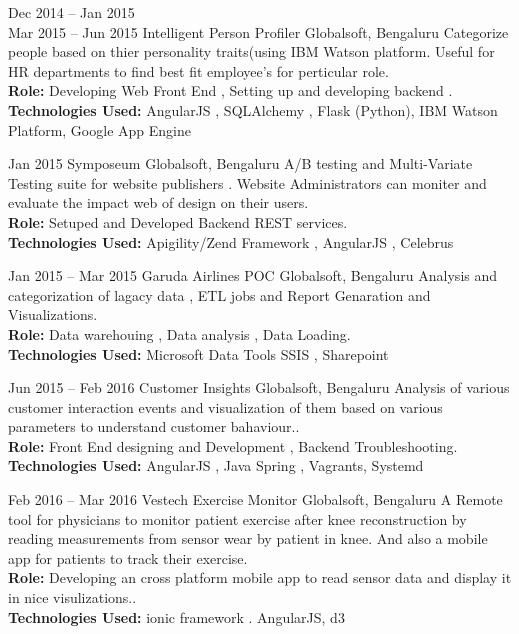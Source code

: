 \documentclass[]{friggeri-cv} %
\begin{document}
\begin{entrylist}
\entry
{ Dec 2014 -- Jan 2015\\
Mar 2015 -- Jun 2015}
{Intelligent Person Profiler}
{Globalsoft, Bengaluru}
{Categorize people based on thier personality traits(using IBM Watson platform. Useful for HR departments to find best fit employee's for perticular role.\\
\textbf{Role:} Developing Web Front End  , Setting up and developing backend .\\
\textbf{Technologies Used:} AngularJS , SQLAlchemy , Flask (Python), IBM Watson Platform, Google App Engine}
\end{entrylist}

\begin{entrylist}
\entry
{Jan 2015}
{Symposeum}
{Globalsoft, Bengaluru}
{A/B testing and Multi-Variate Testing suite for website publishers . Website Administrators can moniter and evaluate the impact web of design on their users.\\
\textbf{Role:} Setuped and Developed Backend REST services.\\
\textbf{Technologies Used:} Apigility/Zend Framework , AngularJS , Celebrus}
\end{entrylist}

\begin{entrylist}
\entry
{Jan 2015 -- Mar 2015}
{Garuda Airlines POC}
{Globalsoft, Bengaluru}
{Analysis and categorization of lagacy data , ETL jobs and Report Genaration and Visualizations.\\
\textbf{Role:} Data warehouing , Data analysis , Data Loading.\\
\textbf{Technologies Used:} Microsoft Data Tools SSIS , Sharepoint}
\end{entrylist}

\begin{entrylist}
\entry
{Jun 2015 -- Feb 2016}
{Customer Insights}
{Globalsoft, Bengaluru}
{Analysis of various customer interaction events and visualization of them based on various parameters to understand customer bahaviour..\\
\textbf{Role:} Front End designing and Development , Backend Troubleshooting.\\
\textbf{Technologies Used:} AngularJS , Java Spring , Vagrants, Systemd}
\end{entrylist}

\begin{entrylist}
\entry
{Feb 2016 -- Mar 2016}
{Vestech Exercise Monitor}
{Globalsoft, Bengaluru}
{A Remote tool for physicians to monitor patient exercise after knee reconstruction by reading measurements from sensor wear by patient in knee. And also a mobile app for patients to track their exercise.\\
\textbf{Role:} Developing an cross platform mobile app to read sensor data and display it in nice visulizations..\\
\textbf{Technologies Used:} ionic framework . AngularJS, d3}
\end{entrylist}
\end{document}

